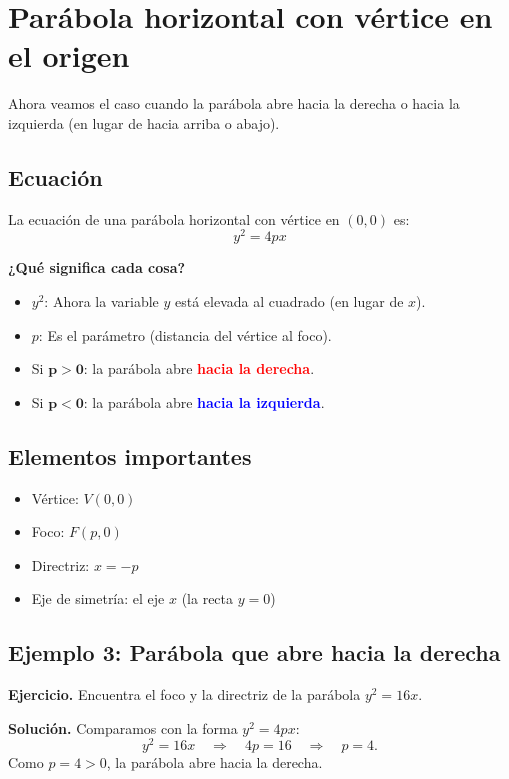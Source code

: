 \documentclass[12pt,a4paper]{article}
\begin{document}
	\section{Parábola horizontal con vértice en el origen}

	Ahora veamos el caso cuando la parábola abre hacia la derecha o hacia la izquierda (en lugar de hacia arriba o abajo).

	\subsection*{Ecuación}

	La ecuación de una parábola horizontal con vértice en \((0,0)\) es:
	\[
	\boxed{y^2=4px}
	\]

	\textbf{¿Qué significa cada cosa?}
	\begin{itemize}
		\item \(y^2\): Ahora la variable \(y\) está elevada al cuadrado (en lugar de \(x\)).
		\item \(p\): Es el parámetro (distancia del vértice al foco).
		\item Si \(\mathbf{p>0}\): la parábola abre \textcolor{red}{\textbf{hacia la derecha}}.
		\item Si \(\mathbf{p<0}\): la parábola abre \textcolor{blue}{\textbf{hacia la izquierda}}.
	\end{itemize}

	\subsection*{Elementos importantes}
	\begin{itemize}
		\item Vértice: \(V(0,0)\)
		\item Foco: \(F(p,0)\)
		\item Directriz: \(x=-p\)
		\item Eje de simetría: el eje \(x\) (la recta \(y=0\))
	\end{itemize}

	\subsection*{Ejemplo 3: Parábola que abre hacia la derecha}

	\textbf{Ejercicio.} Encuentra el foco y la directriz de la parábola \(y^2=16x\).

	\bigskip

	\textbf{Solución.} Comparamos con la forma \(y^2=4px\):
	\[
	y^2=16x \quad\Rightarrow\quad 4p=16 \quad\Rightarrow\quad p=4.
	\]
	Como \(p=4>0\), la parábola abre hacia la derecha.
\end{document}
